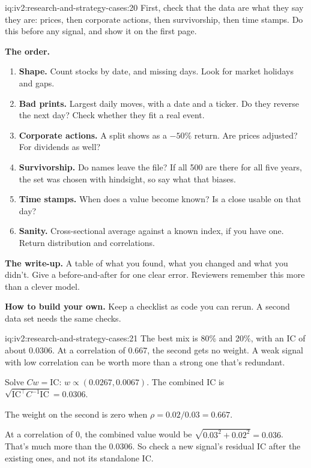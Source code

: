 \begin{solution}{iq:iv2:research-and-strategy-cases:20}
First, check that the data are what they say they are: prices, then corporate actions, then survivorship, then time stamps. Do this before any signal, and show it on the first page.

\textbf{The order.}
\begin{enumerate}
\item \textbf{Shape.} Count stocks by date, and missing days. Look for market holidays and gaps.
\item \textbf{Bad prints.} Largest daily moves, with a date and a ticker. Do they reverse the next day? Check whether they fit a real event.
\item \textbf{Corporate actions.} A split shows as a $-50\%$ return. Are prices adjusted? For dividends as well?
\item \textbf{Survivorship.} Do names leave the file? If all 500 are there for all five years, the set was chosen with hindsight, so say what that biases.
\item \textbf{Time stamps.} When does a value become known? Is a close usable on that day?
\item \textbf{Sanity.} Cross-sectional average against a known index, if you have one. Return distribution and correlations.
\end{enumerate}

\textbf{The write-up.} A table of what you found, what you changed and what you didn't. Give a before-and-after for one clear error. Reviewers remember this more than a clever model.

\textbf{How to build your own.} Keep a checklist as code you can rerun. A second data set needs the same checks.

\end{solution}

\begin{solution}{iq:iv2:research-and-strategy-cases:21}
The best mix is 80\% and 20\%, with an IC of about 0.0306. At a correlation of 0.667, the second gets no weight. A weak signal with low correlation can be worth more than a strong one that's redundant.

Solve $Cw = \mathrm{IC}$: $w \propto (0.0267, 0.0067)$. The combined IC is $\sqrt{\mathrm{IC}^\top C^{-1}\mathrm{IC}} = 0.0306$.

The weight on the second is zero when $\rho = 0.02/0.03 = 0.667$.

At a correlation of 0, the combined value would be $\sqrt{0.03^2 + 0.02^2} = 0.036$. That's much more than the 0.0306. So check a new signal's residual IC after the existing ones, and not its standalone IC.

\end{solution}

